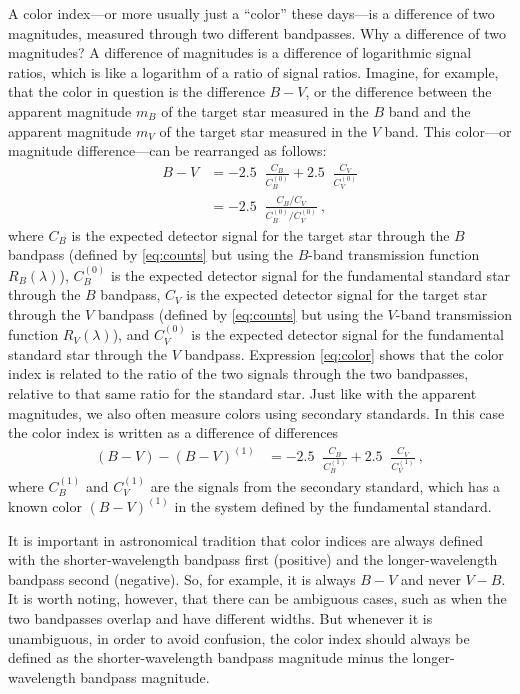 \documentclass[10pt]{article}
\DeclareMathOperator{\logten}{log_{10}}
\begin{document}
A color index---or more usually just a ``color'' these days---is a difference of two magnitudes, measured through two different bandpasses.
Why a difference of two magnitudes?
A difference of magnitudes is a difference of logarithmic signal ratios, which is like a logarithm of a ratio of signal ratios.
Imagine, for example, that the color in question is the difference $B-V$, or the difference between the apparent magnitude $m_B$ of the target star measured in the $B$ band and the apparent magnitude $m_V$ of the target star measured in the $V$ band.
This color---or magnitude difference---can be rearranged as follows:
\begin{align}
    B-V &= -2.5\logten\frac{C_B}{C^{(0)}_B} + 2.5\logten\frac{C_V}{C^{(0)}_V}\\
        &= -2.5\logten\frac{C_B/C_V}{C^{(0)}_B/C^{(0)}_V}\label{eq:color} ~,
\end{align}
where $C_B$ is the expected detector signal for the target star through the $B$ bandpass (defined by \eqref{eq:counts} but using the $B$-band transmission function $R_B(\lambda)$),
$C^{(0)}_B$ is the expected detector signal for the fundamental standard star through the $B$ bandpass,
$C_V$ is the expected detector signal for the target star through the $V$ bandpass (defined by \eqref{eq:counts} but using the $V$-band transmission function $R_V(\lambda)$), and
$C^{(0)}_V$ is the expected detector signal for the fundamental standard star through the $V$ bandpass.
Expression \eqref{eq:color} shows that the color index is related to the ratio of the two signals through the two bandpasses, relative to that same ratio for the standard star.
Just like with the apparent magnitudes, we also often measure colors using secondary standards.
In this case the color index is written as a difference of differences
\begin{align}
    (B-V) - (B-V)^{(1)} &= -2.5\logten\frac{C_B}{C^{(1)}_B} + 2.5\logten\frac{C_V}{C^{(1)}_V} ~,
\end{align}
where $C^{(1)}_B$ and $C^{(1)}_V$ are the signals from the secondary standard, which has a known color $(B-V)^{(1)}$ in the system defined by the fundamental standard.

It is important in astronomical tradition that color indices are always defined with the shorter-wavelength bandpass first (positive) and the longer-wavelength bandpass second (negative).
So, for example, it is always $B-V$ and never $V-B$.
It is worth noting, however, that there can be ambiguous cases, such as when the two bandpasses overlap and have different widths.
But whenever it is unambiguous, in order to avoid confusion, the color index should always be defined as the shorter-wavelength bandpass magnitude minus the longer-wavelength bandpass magnitude.
\end{document}

